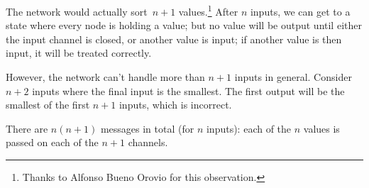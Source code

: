 \begin{answerI}
The network would actually sort~$n+1$ values.\footnote{Thanks to Alfonso Bueno
  Orovio for this observation.}  After $n$ inputs, we can get to a state where
every node is holding a value; but no value will be output until either the
input channel is closed, or another value is input; if another value is then
input, it will be treated correctly.

However, the network can't handle more than $n+1$ inputs in general.  Consider
$n+2$ inputs where the final input is the smallest.  The first output will be
the smallest of the first $n+1$ inputs, which is incorrect.

There are $n(n+1)$ messages in total (for $n$ inputs): each of the $n$ values
is passed on each of the $n+1$ channels.





\end{answerI}
